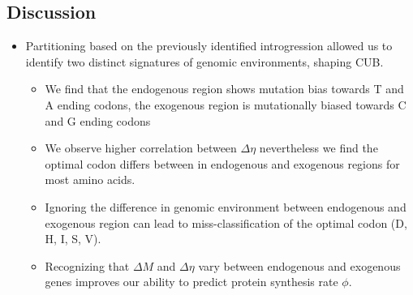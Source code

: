 \documentclass[12pt]{article}
\begin{document}
\subsection*{Discussion}

\begin{itemize}
	\item Partitioning \kluyveri based on the previously identified introgression allowed us to identify two distinct signatures of genomic environments, shaping CUB.
	\begin{itemize}
		\item We find that the endogenous region shows mutation bias towards T and A ending codons, the exogenous region is mutationally biased towards C and G ending codons %
		\item We observe higher correlation between $\Delta \eta$ nevertheless we find the optimal codon differs between in endogenous and exogenous regions for most amino acids.%
		\item Ignoring the difference in genomic environment between endogenous and exogenous region can lead to miss-classification of the optimal codon (D, H, I, S, V).
		\item Recognizing that $\Delta M$ and $\Delta \eta$ vary between endogenous and exogenous genes improves our ability to predict protein synthesis rate $\phi$.

\end{itemize}
\end{itemize}
\end{document}
